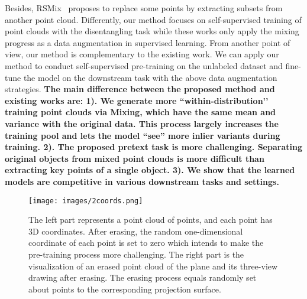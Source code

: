 \documentclass[journal]{IEEEtran}
\begin{document}
Besides, RSMix~\cite{lee2021regularization} proposes to replace some points by extracting subsets from another point cloud. 
Differently, our method focuses on self-supervised training of point clouds with the disentangling task while these works only apply the mixing progress as a data augmentation in supervised learning. 
From another point of view, our method is complementary to the existing work.
We can apply our method to conduct self-supervised pre-training on the unlabeled dataset and fine-tune the model on the downstream task with the above data augmentation strategies. 
\textbf{The main difference between the proposed method and existing works are: 1). We generate more ``within-distribution’’ training point clouds via Mixing, which have the same mean and variance with the original data. This process largely increases the training pool and lets the model ``see'' more inlier variants during training. 2). The proposed pretext task is more challenging. Separating original objects from mixed point clouds is more difficult than extracting key points of a single object. 3). We show that the learned models are competitive in various downstream tasks and settings.}


\begin{figure}[t]
\begin{center}
\texttt{[image: images/2coords.png]}
\end{center}
\vspace{-.15in}
   \caption{The left part represents a point cloud of  points, and each point has 3D coordinates. After erasing, the random one-dimensional coordinate of each point is set to zero which intends to make the pre-training process more challenging. The right part is the visualization of an erased point cloud of the plane and its three-view drawing after erasing. The erasing process equals randomly set about  points to the corresponding projection surface.}
\label{fig:2coords}
\end{figure}
\end{document}
